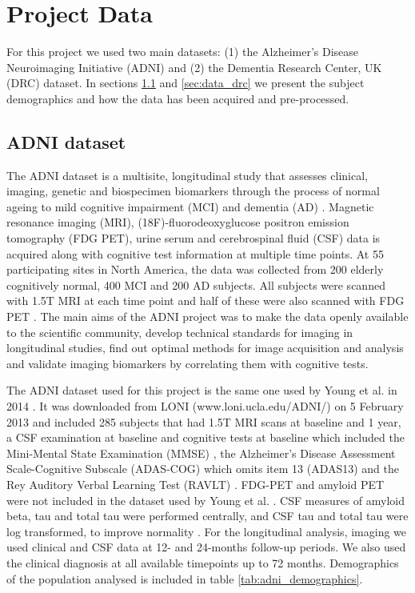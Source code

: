 \chapter{Project Data}
\label{chapter:methods_project_data}

For this project we used two main datasets: (1) the Alzheimer's Disease Neuroimaging Initiative (ADNI) and (2) the Dementia Research Center, UK (DRC) dataset. In sections \ref{sec:data_adni} and \ref{sec:data_drc} we present the subject demographics and how the data has been acquired and pre-processed. 

\section{ADNI dataset}
\label{sec:data_adni}

The ADNI dataset is a multisite, longitudinal study that assesses clinical, imaging, genetic and biospecimen biomarkers through the process of normal ageing to mild cognitive impairment (MCI) and dementia (AD) \cite{jack2008alzheimer}. Magnetic resonance imaging (MRI), (18F)-fluorodeoxyglucose positron emission tomography (FDG PET), urine serum and cerebrospinal fluid (CSF) data is acquired along with cognitive test information at multiple time points. At 55 participating sites in North America, the data was collected from 200 elderly cognitively normal, 400 MCI and 200 AD subjects. All subjects were scanned with 1.5T MRI at each time point and half of these were also scanned with FDG PET \cite{jack2008alzheimer}.  The main aims of the ADNI project was to make the data openly available to the scientific community, develop technical standards for imaging in longitudinal studies, find out optimal methods for image acquisition and analysis and validate imaging biomarkers by correlating them with cognitive tests. 

The ADNI dataset used for this project is the same one used by Young et al. in 2014 \cite{young2014data}. It was downloaded from LONI (www.loni.ucla.edu/ADNI/) on 5 February 2013 and included 285 subjects that had 1.5T MRI scans at baseline and 1 year, a CSF examination at baseline and cognitive tests at baseline which included the Mini-Mental State Examination (MMSE) \cite{mckhann1984clinical}, the Alzheimer's Disease Assessment Scale-Cognitive Subscale (ADAS-COG) \cite{rosen1984new} which omits item 13 (ADAS13) and the Rey Auditory Verbal Learning Test (RAVLT) \cite{rey1958examen}. FDG-PET and amyloid PET were not included in the dataset used by Young et al. \cite{young2014data}. CSF measures of amyloid beta, tau and total tau were performed centrally, and CSF tau and total tau were log transformed, to improve normality \cite{young2014data}. For the longitudinal analysis, imaging we used clinical and CSF data at 12- and 24-months follow-up periods. We also used the clinical diagnosis at all available timepoints up to 72 months. Demographics of the population analysed is included in table \ref{tab:adni_demographics}.

